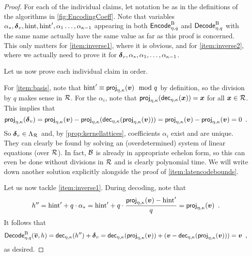 \begin{proof}
For each of the individual claims, let notation be as in the definitions of the algorithms in \autoref{fig:EncodingCoeff}.
Note that variables $\alpha_{\ast},\boldsymbol{\delta}_v, \mathrm{hint}, \mathrm{hint}', \alpha_1\ldots,\alpha_{\kappa-1}$ appearing in both $\mathsf{Encode}^{\textup{B}}_{\eta,q}$ and $\mathsf{Decode}^{\textup{B}}_{\eta,q}$ with the same name actually have the same value as far as this proof is concerned.
This only matters for \autoref{item:inverse1}, where it is obvious, and for \autoref{item:inverse2}, where we actually need to prove it for $\boldsymbol{\delta}_v, \alpha_{\ast},\alpha_1,\ldots,\alpha_{\kappa-1}$.

\medskip\noindent
Let us now prove each individual claim in order.

\bigskip\noindent
For \autoref{item:basis}, note that $\mathrm{hint}' \equiv \mathsf{proj}_{\eta,\kappa}(\boldsymbol{v}) \mod q$ by definition, so the division by $q$ makes sense in $\mathcal{R}$.
For the $\alpha_i$, note that $\mathsf{proj}_{\eta,\kappa}(\mathsf{dec}_{\eta,\kappa}(\boldsymbol{x})) = \boldsymbol{x}$ for all $\boldsymbol{x}\in\mathcal{R}$. This implies that
\[
 \mathsf{proj}_{\eta,\kappa}(\boldsymbol{\delta}_v) = \mathsf{proj}_{\eta,\kappa}(\boldsymbol{v}) - \mathsf{proj}_{\eta,\kappa}(\mathsf{dec}_{\eta,\kappa}(\mathsf{proj}_{\eta,\kappa}(\boldsymbol{v}))) = \mathsf{proj}_{\eta,\kappa}(\boldsymbol{v}) - \mathsf{proj}_{\eta,\kappa}(\boldsymbol{v}) = 0\enspace.
\]
So $\boldsymbol{\delta}_v\in\Lambda_{\mathcal{R}}$ and, by \autoref{prop:kernellattices}, coefficients $\alpha_i$ exist and are unique.
They can clearly be found by solving an (overdetermined) system of linear equations (over $\mathcal{R}$).
In fact, $\mathcal{B}$ is already in appropriate echelon form, so this can even be done without divisions in $\mathcal{R}$ and is clearly polynomial time. We will write down another solution explicitly alongside the proof of \autoref{item:latencodebounds}.

\bigskip\noindent
Let us now tackle \autoref{item:inverse1}.
During decoding, note that
\[
 h'' = \mathrm{hint}' + q\cdot\alpha_{\ast} = \mathrm{hint}'+q\cdot\frac{\mathsf{proj}_{\eta,\kappa}(\boldsymbol{v})-\mathrm{hint}'}{q} = \mathsf{proj}_{\eta,\kappa}(\boldsymbol{v})\enspace.
\]
It follows that
\[
 \mathsf{Decode}^{\textup{B}}_{\eta,q}(\overline{\boldsymbol{v}}, h) = \mathsf{dec}_{\eta,\kappa}(h'') + \boldsymbol{\delta}_v = \mathsf{dec}_{\eta,\kappa}(\mathsf{proj}_{\eta,\kappa}(\boldsymbol{v})) + (\boldsymbol{v} - \mathsf{dec}_{\eta,\kappa}(\mathsf{proj}_{\eta,\kappa}(\boldsymbol{v}))) = \boldsymbol{v}\enspace,
\]
as desired.



\end{proof}
